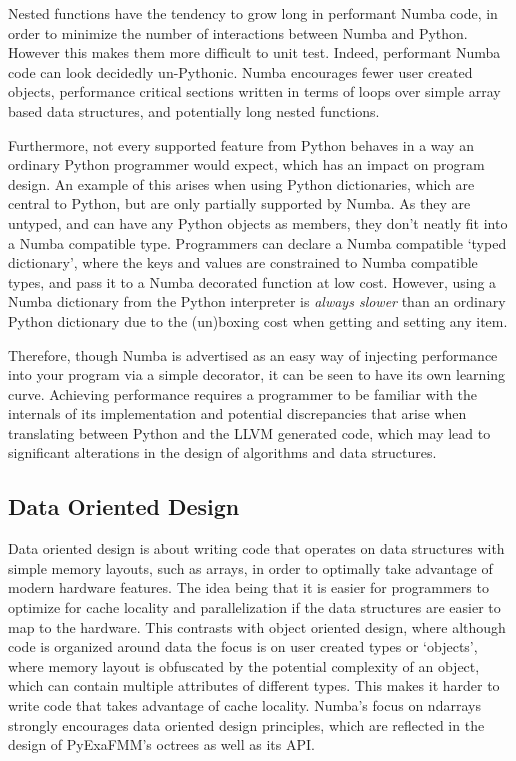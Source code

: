 Nested functions have the tendency to grow long in performant Numba code, in order to minimize the number of interactions between Numba and Python. However this makes them more difficult to unit test. Indeed, performant Numba code can look decidedly un-Pythonic. Numba encourages fewer user created objects, performance critical sections written in terms of loops over simple array based data structures, and potentially long nested functions. 

Furthermore, not every supported feature from Python behaves in a way an ordinary Python programmer would expect, which has an impact on program design. An example of this arises when using Python dictionaries, which are central to Python, but are only partially supported by Numba. As they are untyped, and can have any Python objects as members, they don't neatly fit into a Numba compatible type. Programmers can declare a Numba compatible `typed dictionary', where the keys and values are constrained to Numba compatible types, and pass it to a Numba decorated function at low cost. However, using a Numba dictionary from the Python interpreter is \textit{always slower} than an ordinary Python dictionary due to the (un)boxing cost when getting and setting any item.

Therefore, though Numba is advertised as an easy way of injecting performance into your program via a simple decorator, it can be seen to have its own learning curve. Achieving performance requires a programmer to be familiar with the internals of its implementation and potential discrepancies that arise when translating between Python and the LLVM generated code, which may lead to significant alterations in the design of algorithms and data structures.

\subsection*{Data Oriented Design}

Data oriented design is about writing code that operates on data structures with simple memory layouts, such as arrays, in order to optimally take advantage of modern hardware features. The idea being that it is easier for programmers to optimize for cache locality and parallelization if the data structures are easier to map to the hardware. This contrasts with object oriented design, where although code is organized around data the focus is on user created types or `objects', where memory layout is obfuscated by the potential complexity of an object, which can contain multiple attributes of different types. This makes it harder to write code that takes advantage of cache locality. Numba's focus on ndarrays strongly encourages data oriented design principles, which are reflected in the design of PyExaFMM's octrees as well as its API.

